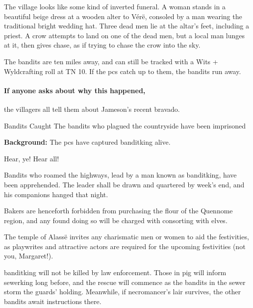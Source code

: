 \begin{boxtext}

  The village looks like some kind of inverted funeral.
  A woman stands in a beautiful beige dress at a wooden alter to V\'{e}r\"{e}, consoled by a man wearing the traditional bright wedding hat.
  Three dead men lie at the altar's feet, including a priest.
  A crow attempts to land on one of the dead men, but a local man lunges at it, then gives chase, as if trying to chase the crow into the sky.

\end{boxtext}

The bandits are ten miles away, and can still be tracked with a Wits + Wyldcrafting roll at TN 10.
If the \glspl{pc} catch up to them, the bandits run away.

\paragraph{If anyone asks about why this happened,}
the villagers all tell them about Jameson's recent bravado.

{Bandits Caught}%
{The bandits who plagued the countryside have been imprisoned}%

\stopcontents[Town]

\textbf{Background:}
The \glspl{pc} have captured \gls{banditking} alive.

\begin{boxtext}

  Hear, ye!  Hear all!

  Bandits who roamed the highways, lead by a man known as \gls{banditking}, have been apprehended.  The leader shall be drawn and quartered by week's end, and his companions hanged that night.

  Bakers are henceforth forbidden from purchasing the flour of the Quennome region, and any found doing so will be charged with consorting with elves.

  The temple of Alass\"e invites any charismatic men or women to aid the festivities, as playwrites and attractive actors are required for the upcoming festivities (not you, Margaret!).

\end{boxtext}

\Gls{banditking} will not be killed by law enforcement.
Those in \gls{pig} will inform \gls{sewerking} long before, and the rescue will commence as the bandits in the sewer storm the guards' holding.
Meanwhile, if \gls{necromancer}'s lair survives, the other bandits await instructions there.

